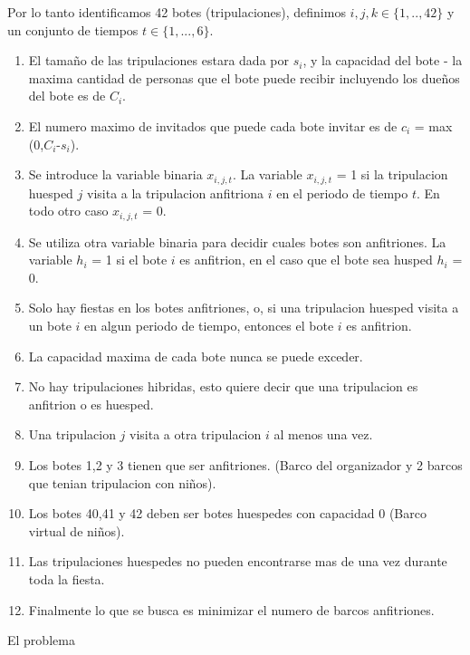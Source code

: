 \documentclass[spanish, fleqn]{article}
\begin{document}
\newpage

Por lo tanto identificamos 42 botes (tripulaciones), definimos $\mathit{i},\mathit{j},\mathit{k} \in \{1,..,42\}$ y un conjunto de tiempos $\mathit{t} \in \{1,...,6\}$.

\begin{enumerate}
\item El tamaño de las tripulaciones estara dada por $\mathit{s}_{\mathit{i}}$, y la capacidad del bote - la maxima cantidad de personas que el bote puede recibir incluyendo los dueños del bote es de $\mathit{C}_{\mathit{i}}$.

\item El numero maximo de invitados que puede cada bote invitar es de $\mathit{c}_{\mathit{i}}$ = max (0,$\mathit{C}_{\mathit{i}}$-$\mathit{s}_{\mathit{i}}$).

\item Se introduce la variable binaria $\mathit{x}_{\mathit{i},\mathit{j},\mathit{t}}$. La variable $\mathit{x}_{\mathit{i},\mathit{j},\mathit{t}}$ = 1 si la tripulacion huesped $\mathit{j}$ visita a la tripulacion anfitriona $\mathit{i}$ en el periodo de tiempo $\mathit{t}$. En todo otro caso $\mathit{x}_{\mathit{i},\mathit{j},\mathit{t}}$ = 0.

\item Se utiliza otra variable binaria para decidir cuales botes son anfitriones. La variable $\mathit{h}_{\mathit{i}}$ = 1 si el bote $\mathit{i}$ es anfitrion, en el caso que el bote sea husped $\mathit{h}_{\mathit{i}}$ = 0.

\item Solo hay fiestas en los botes anfitriones, o, si una tripulacion huesped visita a un bote $\mathit{i}$ en algun periodo de tiempo, entonces el bote $\mathit{i}$ es anfitrion.

\item La capacidad maxima de cada bote nunca se puede exceder.

\item No hay tripulaciones hibridas, esto quiere decir que una tripulacion es anfitrion o es huesped.

\item Una tripulacion $\mathit{j}$ visita a otra tripulacion $\mathit{i}$ al menos una vez.

\item Los botes 1,2 y 3 tienen que ser anfitriones. (Barco del organizador y 2 barcos que tenian tripulacion con niños).

\item Los botes 40,41 y 42 deben ser botes huespedes con capacidad 0 (Barco virtual de niños).

\item Las tripulaciones huespedes no pueden encontrarse mas de una vez durante toda la fiesta.

\item Finalmente lo que se busca es minimizar el numero de barcos anfitriones.

\end{enumerate}

El problema 




\end{document}

